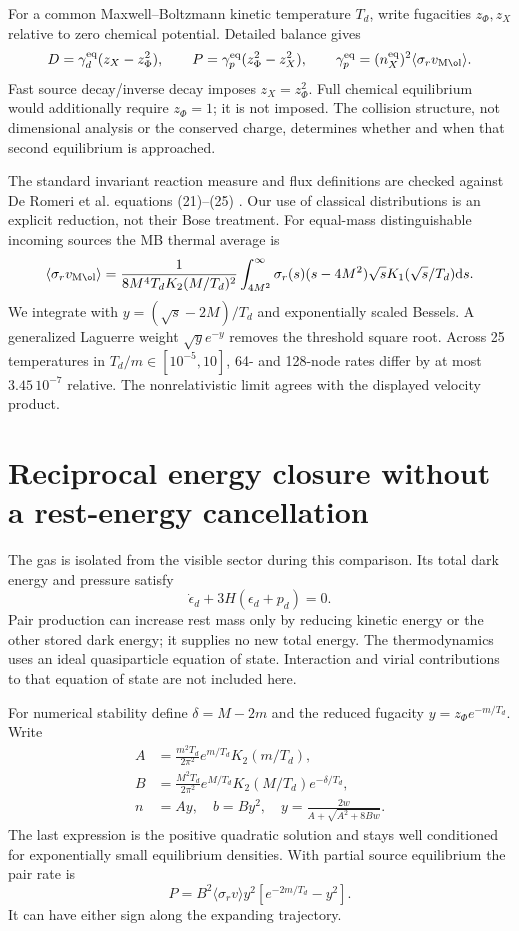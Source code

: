 \documentclass[11pt]{article}
\newcommand{\dd}{\mathrm d}
\newcommand{\eq}{\mathrm{eq}}
\begin{document}
For a common Maxwell--Boltzmann kinetic temperature $T_d$, write fugacities
$z_\Phi,z_X$ relative to zero chemical potential. Detailed balance gives
\begin{equation}
 D=\gamma_d^\eq(z_X-z_\Phi^2),\qquad
 P=\gamma_p^\eq(z_\Phi^2-z_X^2),\qquad
 \gamma_p^\eq=(n_X^\eq)^2\langle\sigma_r v_{\rm M\o l}\rangle.
\end{equation}
Fast source decay/inverse decay imposes $z_X=z_\Phi^2$. Full chemical
equilibrium would additionally require $z_\Phi=1$; it is not imposed.
The collision structure, not dimensional analysis or the conserved charge,
determines whether and when that second equilibrium is approached.

The standard invariant reaction measure and flux definitions are checked
against De Romeri et al. equations (21)--(25) \cite{rates}. Our use of
classical distributions is an explicit reduction, not their Bose treatment.
For equal-mass distinguishable incoming sources the MB thermal average is
\begin{equation}
 \langle\sigma_rv_{\rm M\o l}\rangle=
 \frac{1}{8M^4T_d K_2(M/T_d)^2}
 \int_{4M^2}^\infty\sigma_r(s)(s-4M^2)\sqrt{s}
 K_1(\sqrt{s}/T_d)\dd s.
\end{equation}
We integrate with $y=(\sqrt s-2M)/T_d$ and exponentially scaled Bessels.
A generalized Laguerre weight $\sqrt y e^{-y}$ removes the threshold
square root. Across 25 temperatures in $T_d/m\in[10^{-5},10]$, 64- and
128-node rates differ by at most $3.45\,10^{-7}$ relative. The nonrelativistic
limit agrees with the displayed velocity product.

\section{Reciprocal energy closure without a rest-energy cancellation}
The gas is isolated from the visible sector during this comparison. Its
total dark energy and pressure satisfy
\begin{equation}
 \dot\epsilon_d+3H(\epsilon_d+p_d)=0.
\end{equation}
Pair production can increase rest mass only by reducing kinetic energy or
the other stored dark energy; it supplies no new total energy.
The thermodynamics uses an ideal quasiparticle equation of state. Interaction
and virial contributions to that equation of state are not included here.

For numerical stability define $\delta=M-2m$ and the reduced fugacity
$y=z_\Phi e^{-m/T_d}$. Write
\begin{align}
 A&=\frac{m^2T_d}{2\pi^2}e^{m/T_d}K_2(m/T_d),\\
 B&=\frac{M^2T_d}{2\pi^2}e^{M/T_d}K_2(M/T_d)e^{-\delta/T_d},\\
 n&=Ay,\quad b=By^2,\quad
 y=\frac{2w}{A+\sqrt{A^2+8Bw}}.
\end{align}
The last expression is the positive quadratic solution and stays well
conditioned for exponentially small equilibrium densities. With partial
source equilibrium the pair rate is
\begin{equation}
 P=B^2\langle\sigma_rv\rangle y^2
 [e^{-2m/T_d}-y^2].
\end{equation}
It can have either sign along the expanding trajectory.
\end{document}
